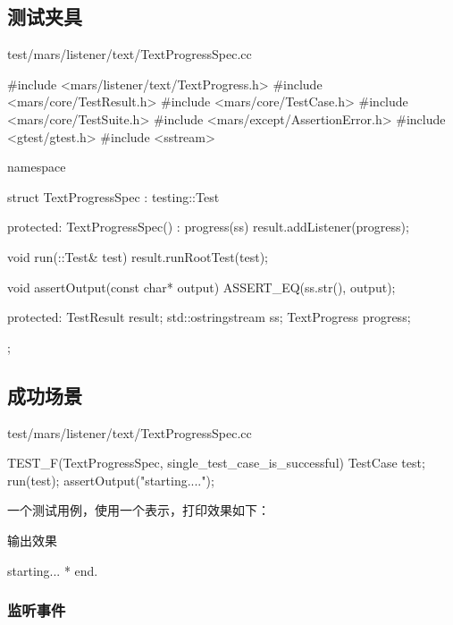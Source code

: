 \begin{content}

\subsection{测试夹具}

\begin{nodiff}{test/mars/listener/text/TextProgressSpec.cc}
 \begin{c++}
#include <mars/listener/text/TextProgress.h>
#include <mars/core/TestResult.h>
#include <mars/core/TestCase.h>
#include <mars/core/TestSuite.h>
#include <mars/except/AssertionError.h>
#include <gtest/gtest.h>
#include <sstream>

namespace {
  struct TextProgressSpec : testing::Test {
  protected:
    TextProgressSpec() : progress(ss) {
      result.addListener(progress);
    }

    void run(::Test& test) {
      result.runRootTest(test);
    }

    void assertOutput(const char* output) {
      ASSERT_EQ(ss.str(), output);
    }

  protected:
    TestResult result;
    std::ostringstream ss;
    TextProgress progress;
  };
}
 \end{c++}
\end{nodiff}

\subsection{成功场景}

\begin{nodiff}{test/mars/listener/text/TextProgressSpec.cc}
 \begin{c++}
TEST_F(TextProgressSpec, single_test_case_is_successful) {
  TestCase test;
  run(test);
  assertOutput("starting...\n*\nend.\n");
}
 \end{c++}
\end{nodiff}

一个测试用例，使用一个\ascii{*}表示，打印效果如下：

\begin{nodiff}{输出效果}
 \begin{c++}
starting...
*
end.
 \end{c++}
\end{nodiff}

\subsubsection{监听事件}


\end{content}
